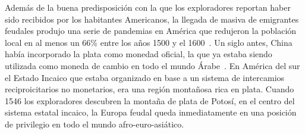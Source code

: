 \documentclass[a4paper,10pt]{book}
\theoremstyle{definition}
\begin{document}

Además de la buena predisposición con la que los exploradores reportan haber sido recibidos por los habitantes Americanos, la llegada de masiva de emigrantes feudales produjo una serie de pandemias en América que redujeron la población local en al menos un 66\% entre los años 1500 y el 1600~\cite{koch2019-europeanArrival}.
Un siglo antes, China hab\'ia incorporado la plata como monedad oficial, la que ya estaba siendo utilizada como moneda de cambio en todo el mundo Árabe~\cite{pomeranz2000-divergence, pomeranz2018-tradeCreated}.
En América del sur el Estado Incaico que estaba organizado en base a un sistema de intercamios reciproicitarios no monetarios, era una región montañosa rica en plata.
Cuando 1546 los exploradores descubren la montaña de plata de Potosí, en el centro del sistema estatal incaico, la Europa feudal queda inmediatamente en una posición de privilegio en todo el mundo afro-euro-asiático.

\end{document}
